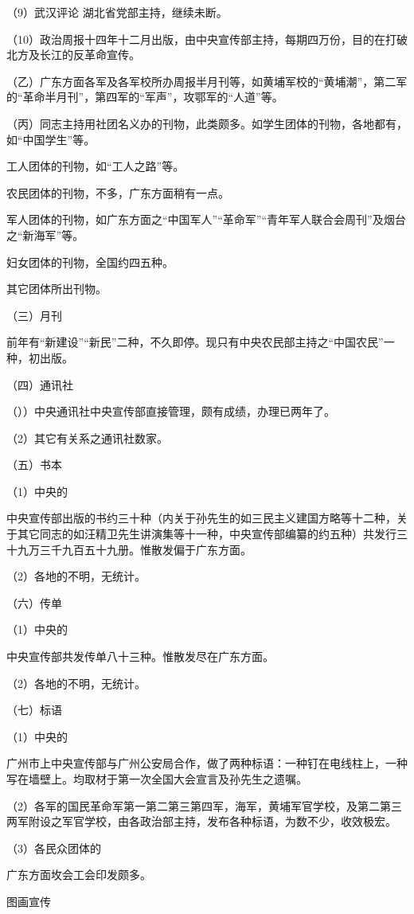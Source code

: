 （9）武汉评论 湖北省党部主持，继续未断。

（10）政治周报十四年十二月出版，由中央宣传部主持，每期四万份，目的在打破北方及长江的反革命宣传。

（乙）广东方面各军及各军校所办周报半月刊等，如黄埔军校的“黄埔潮”，第二军的“革命半月刊”，第四军的“军声”，攻鄂军的“人道”等。

（丙）同志主持用社团名义办的刊物，此类颇多。如学生团体的刊物，各地都有，如“中国学生”等。

工人团体的刊物，如“工人之路”等。

农民团体的刊物，不多，广东方面稍有一点。

军人团体的刊物，如广东方面之“中国军人”“革命军”“青年军人联合会周刊”及烟台之“新海军”等。

妇女团体的刊物，全国约四五种。

其它团体所出刊物。

（三）月刊

前年有“新建设”“新民”二种，不久即停。现只有中央农民部主持之“中国农民”一种，初出版。

（四）通讯社

（））中央通讯社中央宣传部直接管理，颇有成绩，办理已两年了。

（2）其它有关系之通讯社数家。

（五）书本

（1）中央的

中央宣传部出版的书约三十种（内关于孙先生的如三民主义建国方略等十二种，关于其它同志的如汪精卫先生讲演集等十一种，中央宣传部编纂的约五种）共发行三十九万三千九百五十九册。惟散发偏于广东方面。

（2）各地的不明，无统计。

（六）传单

（1）中央的

中央宣传部共发传单八十三种。惟散发尽在广东方面。

（2）各地的不明，无统计。

（七）标语

（1）中央的

广州市上中央宣传部与广州公安局合作，做了两种标语：一种钉在电线柱上，一种写在墙壁上。均取材于第一次全国大会宣言及孙先生之遗嘱。

（2）各军的国民革命军第一第二第三第四军，海军，黄埔军官学校，及第二第三两军附设之军官学校，由各政治部主持，发布各种标语，为数不少，收效极宏。

（3）各民众团体的

广东方面坆会工会印发颇多。

图画宣传

